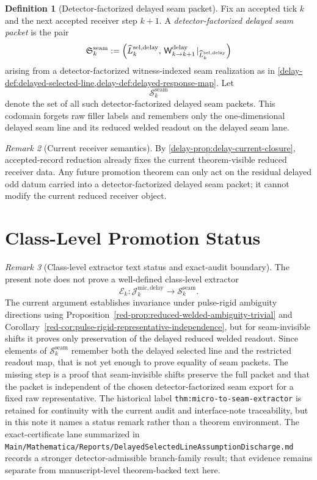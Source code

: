 \documentclass[11pt]{article}
\theoremstyle{definition}
\newtheorem{definition}{Definition}[section]
\theoremstyle{plain}
\theoremstyle{remark}
\newtheorem{remark}[definition]{Remark}
\begin{document}
\begin{definition}[Detector-factorized delayed seam packet]
\label{def:seam-packet-object}
Fix an accepted tick \(k\) and the next accepted receiver step \(k+1\).
A \emph{detector-factorized delayed seam packet} is the pair
\[
\mathfrak S^{\mathrm{seam}}_k
:=
\Bigl(
\widehat L^{\mathrm{sel,delay}}_k,\,
\mathsf W^{\mathrm{delay}}_{k\to k+1}\!\mid_{\widehat L^{\mathrm{sel,delay}}_k}
\Bigr)
\]
arising from a detector-factorized witness-indexed seam realization as in
\cref{delay-def:delayed-selected-line,delay-def:delayed-response-map}.
Let
\[
\mathcal S^{\mathrm{seam}}_k
\]
denote the set of all such detector-factorized delayed seam packets.
This codomain forgets raw filler labels and remembers only the one-dimensional delayed seam line and
its reduced welded readout on the delayed seam lane.
\end{definition}

\begin{remark}[Current receiver semantics]
\label{prop:micro-to-seam-preserves-current}
By \cref{delay-prop:delay-current-closure}, accepted-record reduction already fixes the current
theorem-visible reduced receiver data.
Any future promotion theorem can only act on the residual delayed odd datum carried into a
detector-factorized delayed seam packet; it cannot modify the current reduced receiver object.
\end{remark}

\section{Class-Level Promotion Status}

\begin{remark}[Class-level extractor text status and exact-audit boundary]
\label{thm:micro-to-seam-extractor}
The present note does not prove a well-defined class-level extractor
\[
\mathcal E_k:
\mathcal J^{\mathrm{mic,delay}}_k
\longrightarrow
\mathcal S^{\mathrm{seam}}_k.
\]
The current argument establishes invariance under pulse-rigid ambiguity directions using
Proposition~\ref*{red-prop:reduced-welded-ambiguity-trivial} and
Corollary~\ref*{red-cor:pulse-rigid-representative-independence},
but for seam-invisible shifts it proves only preservation of the delayed reduced welded readout.
Since elements of \(\mathcal S^{\mathrm{seam}}_k\) remember both the delayed selected line and the
restricted readout map, that is not yet enough to prove equality of seam packets.
The missing step is a proof that seam-invisible shifts preserve the full packet and that the packet
is independent of the chosen detector-factorized seam export for a fixed raw representative.
The historical label \texttt{thm:micro-to-seam-extractor} is retained for continuity with the
current audit and interface-note traceability, but in this note it names a status remark rather
than a theorem environment.
The exact-certificate lane summarized in
\texttt{Main/Mathematica/Reports/DelayedSelectedLineAssumptionDischarge.md} records a stronger
detector-admissible branch-family result; that evidence remains separate from manuscript-level
theorem-backed text here.
\end{remark}
\end{document}
